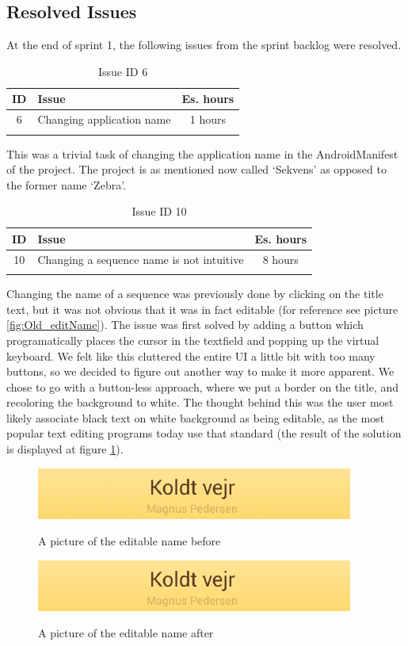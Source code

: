 \subsection{Resolved Issues} \label{subsec:spr1_resolved_issues}

At the end of sprint 1, the following issues from the sprint backlog were resolved.
\begin{longtable} { | c | p{12cm} | c | } 
\hline
	ID 	&	Issue	&		 Es. hours \\\hline
	6	& 	Changing application name	&	1 hours	\\\hline
\caption{Issue ID 6}
\label{tab:spr1_issue6}
\end{longtable}
This was a trivial task of changing the application name in the AndroidManifest of the project. The project is as mentioned now called `Sekvens' as opposed to the former name `Zebra'.

\begin{longtable} { | c | p{12cm} | c | } 
\hline
	ID 	&	Issue	&		 Es. hours \\\hline
	10	& 	Changing a sequence name is not intuitive	&	8 hours	\\\hline
\caption{Issue ID 10}
\label{tab:spr1_issue10}
\end{longtable}
Changing the name of a sequence was previously done by clicking on the title text, but it was not obvious that it was in fact editable (for reference see picture \ref{fig:Old_editName}).  The issue was first solved by adding a button which programatically places the cursor in the textfield and popping up the virtual keyboard. We felt like this cluttered the entire UI a little bit with too many buttons, so we decided to figure out another way to make it more apparent. We chose to go with a button-less approach, where we put a border on the title, and recoloring the background to white. The thought behind this was the user most likely associate black text on white background as being editable, as the most popular text editing programs today use that standard (the result of the solution is displayed at figure \ref{fig:New_editName}). 

\begin{figure} [h!]
\centering
\begin{minipage}{.7\textwidth}
\centering
\includegraphics{Pics/Sprint1/Gammelt/change_sequence_name}
\caption{A picture of the editable name before}
\label{fig:Old_editName}
\includegraphics{Pics/Sprint1/Gammelt/change_sequence_name}
\caption{A picture of the editable name after}
\label{fig:New_editName}
\end{minipage}\hfill
\end{figure}

